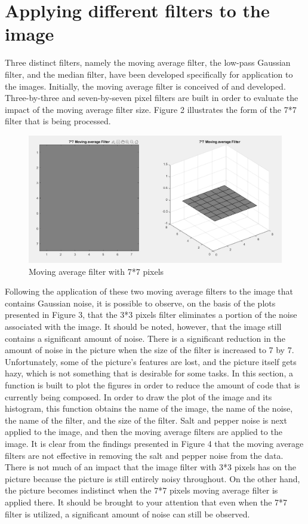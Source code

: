 \section{Applying different filters to the image}\label{P2}

Three distinct filters, namely the moving average filter, the low-pass Gaussian filter, and the median filter, have been developed specifically for application to the images. Initially, the moving average filter is conceived of and developed. Three-by-three and seven-by-seven pixel filters are built in order to evaluate the impact of the moving average filter size. Figure 2 illustrates the form of the 7*7 filter that is being processed.


\begin{figure} [ht]
    \centering
    \includegraphics[width = \textwidth]{Resources/Avg_filter.png}
    \caption{Moving average filter with 7*7 pixels}
    \label{fig:ApplyingFilters}
\end{figure}

Following the application of these two moving average filters to the image that contains Gaussian noise, it is possible to observe, on the basis of the plots presented in Figure 3, that the 3*3 pixels filter eliminates a portion of the noise associated with the image. It should be noted, however, that the image still contains a significant amount of noise. There is a significant reduction in the amount of noise in the picture when the size of the filter is increased to 7 by 7. Unfortunately, some of the picture's features are lost, and the picture itself gets hazy, which is not something that is desirable for some tasks. In this section, a function is built to plot the figures in order to reduce the amount of code that is currently being composed. In order to draw the plot of the image and its histogram, this function obtains the name of the image, the name of the noise, the name of the filter, and the size of the filter. 
Salt and pepper noise is next applied to the image, and then the moving average filters are applied to the image. It is clear from the findings presented in Figure 4 that the moving average filters are not effective in removing the salt and pepper noise from the data. There is not much of an impact that the image filter with 3*3 pixels has on the picture because the picture is still entirely noisy throughout. On the other hand, the picture becomes indistinct when the 7*7 pixels moving average filter is applied there. It should be brought to your attention that even when the 7*7 filter is utilized, a significant amount of noise can still be observed.

